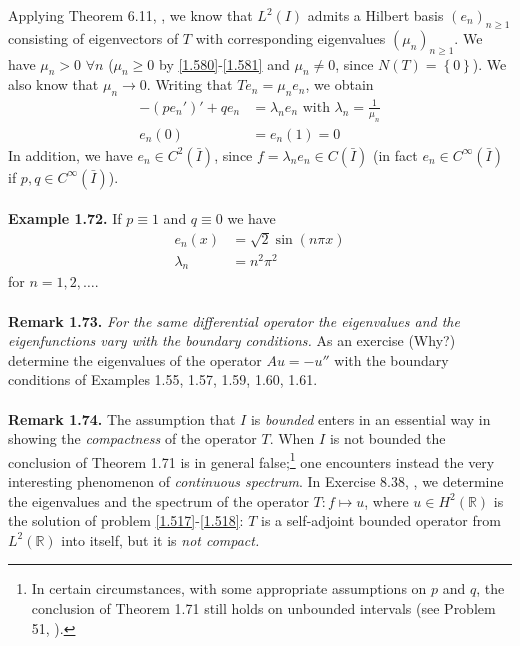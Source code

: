 \documentclass[a4paper,oneside]{book}
\numberwithin{equation}{chapter}
\begin{document}
Applying Theorem 6.11, \cite{1}, we know that $L^2\left(I\right)$ admits a Hilbert basis $\left(e_n\right)_{n\ge 1}$ consisting of eigenvectors of $T$ with corresponding eigenvalues $\left(\mu _n\right)_{n\ge 1}$. We have $\mu _n>0$ $\forall n$ ($\mu _n\ge 0$ by \eqref{1.580}-\eqref{1.581} and $\mu _n\ne 0$, since $N\left( T \right) = \left\{ 0 \right\}$). We also know that $\mu _n\to 0$. Writing that $Te_n=\mu _ne_n$, we obtain
\begin{align}
 - \left( {p{e_n}'} \right)' + q{e_n} &= {\lambda _n}{e_n}\mbox{ with } {\lambda _n} = \frac{1}{{{\mu _n}}}\\
{e_n}\left( 0 \right) &= {e_n}\left( 1 \right) = 0
\end{align}
In addition, we have $e_n\in C^2\left(\bar I\right)$, since $f=\lambda _ne_n\in C\left(\bar I\right)$ (in fact $e_n\in C^{\infty}\left(\bar I\right)$ if $p,q\in C^{\infty}\left(\bar I\right)$).\\
\\
\textbf{Example 1.72.} If $p \equiv 1$ and $q \equiv 0$ we have
\begin{align}
{e_n}\left( x \right) &= \sqrt 2 \sin \left( {n\pi x} \right)\\
{\lambda _n}& = {n^2}{\pi ^2}
\end{align}
for $n=1,2,\ldots$.\\
\\
\textbf{Remark 1.73.} \textit{For the same differential operator the eigenvalues and the eigenfunctions vary with the boundary conditions.} As an exercise  (Why?) determine the eigenvalues of the operator $Au=-u''$ with the boundary conditions of Examples 1.55, 1.57, 1.59, 1.60, 1.61.\\
\\
\textbf{Remark 1.74.} The assumption that $I$ is \textit{bounded} enters in an essential way in showing the \textit{compactness} of the operator $T$. When $I$ is not bounded the conclusion of Theorem 1.71 is in general false;\footnote{In certain circumstances, with some appropriate assumptions on $p$ and $q$, the conclusion of Theorem 1.71 still holds on unbounded intervals (see Problem 51, \cite{1}).} one encounters instead the very interesting phenomenon of \textit{continuous spectrum}. In Exercise 8.38, \cite{1}, we determine the eigenvalues and the spectrum of the operator $T:f\mapsto u$, where $u\in H^2\left(\mathbb{R}\right)$ is the solution of problem \eqref{1.517}-\eqref{1.518}: $T$ is a self-adjoint bounded operator from $L^2\left(\mathbb{R}\right)$ into itself, but it is \textit{not compact.}
\end{document}
